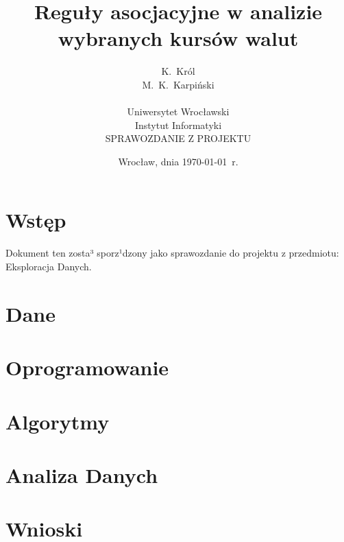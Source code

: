 \documentclass[a4paper,12pt]{article}
\title{Reguły asocjacyjne w analizie wybranych kursów walut}
\author{K.~Król\\
M.~K.~Karpiński\\
\\
Uniwersytet Wrocławski\\
Instytut Informatyki\\
SPRAWOZDANIE Z PROJEKTU}
\date{Wrocław, dnia \today\ r.}
\begin{document}
\thispagestyle{empty}
\maketitle

\newpage

\tableofcontents

\newpage



\section{Wstęp}
\indent \indent Dokument ten zosta³ sporz¹dzony jako sprawozdanie do projektu z przedmiotu: Eksploracja Danych.

\section{Dane}

\section{Oprogramowanie}

\section{Algorytmy}

\section{Analiza Danych}

\section{Wnioski}
\end{document}
